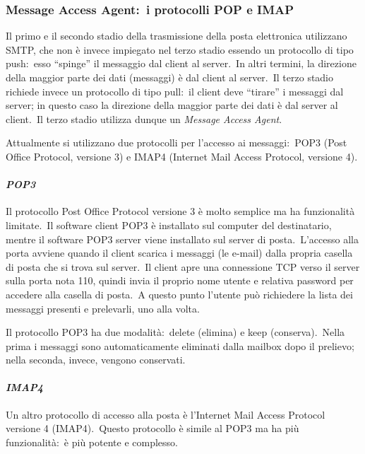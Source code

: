 \subsubsection{Message Access Agent:\ i protocolli POP e IMAP}

Il primo e il secondo stadio della trasmissione della posta elettronica utilizzano SMTP, che non è invece impiegato nel terzo stadio essendo un protocollo di tipo push:\ esso ``spinge'' il messaggio dal client al server.\
In altri termini, la direzione della maggior parte dei dati (messaggi) è dal client al server.\
Il terzo stadio richiede invece un protocollo di tipo pull:\ il client deve ``tirare'' i messaggi dal server; in questo caso la direzione della maggior parte dei dati è dal server al client.\
Il terzo stadio utilizza dunque un \emph{Message Access Agent}.

Attualmente si utilizzano due protocolli per l'accesso ai messaggi:\ POP3 (Post Office Protocol, versione 3) e IMAP4 (Internet Mail Access Protocol, versione 4).

\paragraph{\emph{POP3}}
Il protocollo Post Office Protocol versione 3 è molto semplice ma ha funzionalità limitate.\
Il software client POP3 è installato sul computer del destinatario, mentre il software POP3 server viene installato sul server di posta.\
L'accesso alla porta avviene quando il client scarica i messaggi (le e-mail) dalla propria casella di posta che si trova sul server.\
Il client apre una connessione TCP verso il server sulla porta nota 110, quindi invia il proprio nome utente e relativa password per accedere alla casella di posta.\
A questo punto l'utente può richiedere la lista dei messaggi presenti e prelevarli, uno alla volta.

Il protocollo POP3 ha due modalità:\ delete (elimina) e keep (conserva).\
Nella prima i messaggi sono automaticamente eliminati dalla mailbox dopo il prelievo; nella seconda, invece, vengono conservati.

\paragraph{\emph{IMAP4}}
Un altro protocollo di accesso alla posta è l'Internet Mail Access Protocol versione 4 (IMAP4).\
Questo protocollo è simile al POP3 ma ha più funzionalità:\ è più potente e complesso.


